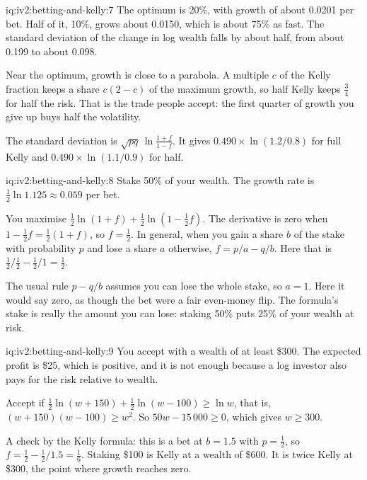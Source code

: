 \begin{solution}{iq:iv2:betting-and-kelly:7}
The optimum is 20\%, with growth of about 0.0201 per bet. Half of it, 10\%, grows about 0.0150, which is about 75\% as fast. The standard deviation of the change in log wealth falls by about half, from about 0.199 to about 0.098.

Near the optimum, growth is close to a parabola. A multiple $c$ of the Kelly fraction keeps a share $c(2 - c)$ of the maximum growth, so half Kelly keeps $\tfrac34$ for half the risk. That is the trade people accept: the first quarter of growth you give up buys half the volatility.

The standard deviation is $\sqrt{pq}\,\ln\tfrac{1 + f}{1 - f}$. It gives $0.490 \times \ln(1.2/0.8)$ for full Kelly and $0.490 \times \ln(1.1/0.9)$ for half.

\end{solution}

\begin{solution}{iq:iv2:betting-and-kelly:8}
Stake 50\% of your wealth. The growth rate is $\tfrac12\ln 1.125 \approx 0.059$ per bet.

You maximise $\tfrac12\ln(1 + f) + \tfrac12\ln(1 - \tfrac12 f)$. The derivative is zero when $1 - \tfrac12 f = \tfrac12(1 + f)$, so $f = \tfrac12$. In general, when you gain a share $b$ of the stake with probability $p$ and lose a share $a$ otherwise, $f = p/a - q/b$. Here that is $\tfrac12/\tfrac12 - \tfrac12/1 = \tfrac12$.

The usual rule $p - q/b$ assumes you can lose the whole stake, so $a = 1$. Here it would say zero, as though the bet were a fair even-money flip. The formula's stake is really the amount you can lose: staking 50\% puts 25\% of your wealth at risk.

\end{solution}

\begin{solution}{iq:iv2:betting-and-kelly:9}
You accept with a wealth of at least \$300. The expected profit is \$25, which is positive, and it is not enough because a log investor also pays for the risk relative to wealth.

Accept if $\tfrac12\ln(w + 150) + \tfrac12\ln(w - 100) \geq \ln w$, that is, $(w + 150)(w - 100) \geq w^2$. So $50w - 15\,000 \geq 0$, which gives $w \geq 300$.

A check by the Kelly formula: this is a bet at $b = 1.5$ with $p = \tfrac12$, so $f = \tfrac12 - \tfrac12/1.5 = \tfrac16$. Staking \$100 is Kelly at a wealth of \$600. It is twice Kelly at \$300, the point where growth reaches zero.

\end{solution}

